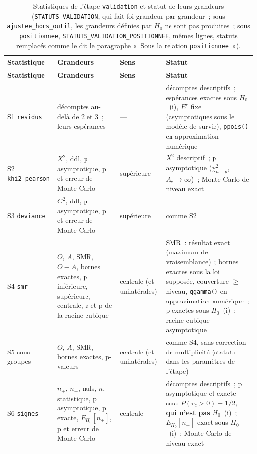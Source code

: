 \documentclass[a4paper,11pt]{article}
\newcommand{\code}[1]{\texttt{\small #1}}
\begin{document}
{\footnotesize
{}
\begin{longtable}{@{}p{2.6cm}p{5.0cm}p{2.0cm}p{5.0cm}@{}}
\caption{Statistiques de l'étape \code{validation} et statut de leurs grandeurs (\code{STATUTS\_VALIDATION}, qui fait foi grandeur par grandeur~; sous \code{ajustee\_hors\_outil}, les grandeurs définies par $H_0$ ne sont pas produites~; sous \code{positionnee}, \code{STATUTS\_VALIDATION\_POSITIONNEE}, mêmes lignes, statuts remplacés comme le dit le paragraphe «~Sous la relation \code{positionnee}~»).}
\label{tab:statistiques-validation}\\
\rowcolor{tableheader}
\textcolor{financeblue}{\textbf{Statistique}} &
\textcolor{financeblue}{\textbf{Grandeurs}} &
\textcolor{financeblue}{\textbf{Sens}} &
\textcolor{financeblue}{\textbf{Statut}} \\
\endfirsthead
\rowcolor{tableheader}
\textcolor{financeblue}{\textbf{Statistique}} &
\textcolor{financeblue}{\textbf{Grandeurs}} &
\textcolor{financeblue}{\textbf{Sens}} &
\textcolor{financeblue}{\textbf{Statut}} \\
\endhead
S1 \code{residus} & décomptes au-delà de 2 et 3~; leurs espérances & --- & décomptes descriptifs~; espérances exactes sous $H_0$~(i), $E^c$ fixe (asymptotiques sous le modèle de survie), \code{ppois()} en approximation numérique \\
S2 \code{khi2\_pearson} & $X^2$, ddl, p asymptotique, p et erreur de Monte-Carlo & supérieure & $X^2$ descriptif~; p asymptotique ($\chi^2_{n-p}$, $A_c \to \infty$)~; Monte-Carlo de niveau exact \\
S3 \code{deviance} & $G^2$, ddl, p asymptotique, p et erreur de Monte-Carlo & supérieure & comme S2 \\
S4 \code{smr} & $O$, $A$, SMR, $O - A$, bornes exactes, p inférieure, supérieure, centrale, $z$ et p de la racine cubique & centrale (et unilatérales) & SMR~: résultat exact (maximum de vraisemblance)~; bornes exactes sous la loi supposée, couverture $\ge$ niveau, \code{qgamma()} en approximation numérique~; p exactes sous $H_0$~(i)~; racine cubique asymptotique \\
S5 sous-groupes & $O$, $A$, SMR, bornes exactes, p-valeurs & centrale (et unilatérales) & comme S4, sans correction de multiplicité (statuts dans les paramètres de l'étape) \\
S6 \code{signes} & $n_{+}$, $n_{-}$, nuls, $n$, statistique, p asymptotique, p exacte, $E_{H_0}[n_{+}]$, p et erreur de Monte-Carlo & centrale & décomptes descriptifs~; p asymptotique et exacte sous $P(r_c > 0) = 1/2$, \textbf{qui n'est pas} $H_0$~(i)~; $E_{H_0}[n_{+}]$ exact sous $H_0$~(i)~; Monte-Carlo de niveau exact \\

\end{longtable}}
\end{document}
